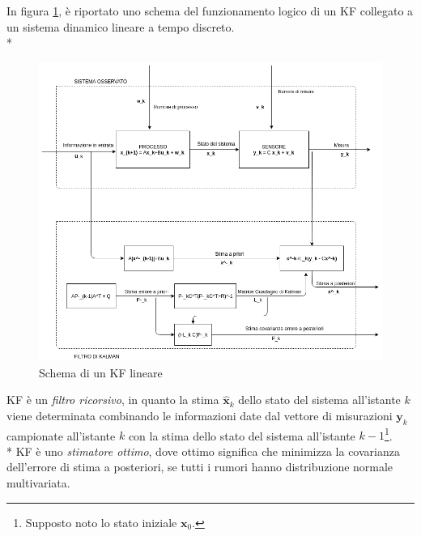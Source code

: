 In figura \ref{fig:kf}, \`e riportato uno schema del funzionamento logico di un KF collegato a un sistema dinamico lineare a tempo discreto.\\*
\begin{figure}[h]
	\centering
	\includegraphics[width=\linewidth]{img/kalman}
	\caption{Schema di un KF lineare}
	\label{fig:kf}
\end{figure}
KF \`e un \emph{filtro ricorsivo}, in quanto la stima $\hat{\mathbf{x}}_k$ dello stato del sistema all'istante $k$ viene determinata combinando le informazioni date dal vettore di misurazioni $\mathbf y_k$ campionate all'istante $k$ con la stima dello stato del sistema all'istante $k-1$\footnote{Supposto noto lo stato iniziale $\mathbf x_0$.}.\\*
KF \`e uno \emph{stimatore ottimo}, dove ottimo significa che minimizza la covarianza dell'errore di stima a posteriori, se tutti i rumori hanno distribuzione normale multivariata. 
\newpage
